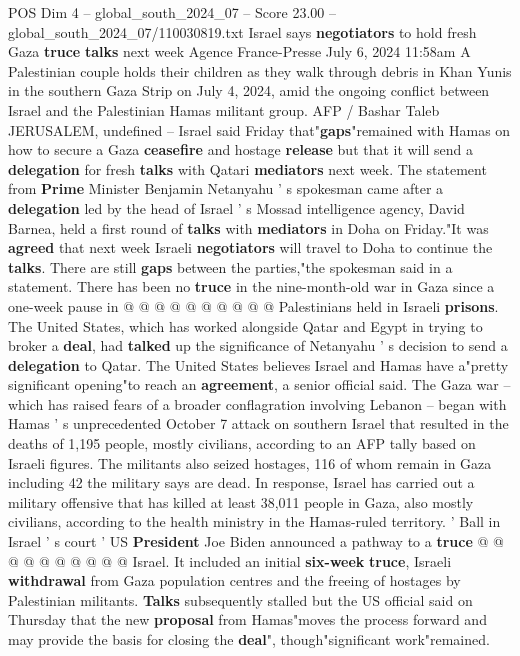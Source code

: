 \begin{textsample}{POS Dim 4 – global\_south\_2024\_07 – Score 23.00 – global\_south\_2024\_07/110030819.txt}  \label{ex:f4_pos_117}
Israel says \textbf{negotiators} to hold fresh Gaza \textbf{truce} \textbf{talks} next week Agence France-Presse July 6, 2024 11:58am A Palestinian couple holds their children as they walk through debris in Khan Yunis in the southern Gaza Strip on July 4, 2024, amid the ongoing conflict between Israel and the Palestinian Hamas militant group.
AFP / Bashar Taleb JERUSALEM, undefined -- Israel said Friday that"\textbf{gaps}"remained with Hamas on how to secure a Gaza \textbf{ceasefire} and hostage \textbf{release} but that it will send a \textbf{delegation} for fresh \textbf{talks} with Qatari \textbf{mediators} next week.
The statement from \textbf{Prime} Minister Benjamin Netanyahu ' s spokesman came after a \textbf{delegation} led by the head of Israel ' s Mossad intelligence agency, David Barnea, held a first round of \textbf{talks} with \textbf{mediators} in Doha on Friday."It was \textbf{agreed} that next week Israeli \textbf{negotiators} will travel to Doha to continue the \textbf{talks}.
There are still \textbf{gaps} between the parties,"the spokesman said in a statement.
There has been no \textbf{truce} in the nine-month-old war in Gaza since a one-week pause in @ @ @ @ @ @ @ @ @ @ Palestinians held in Israeli \textbf{prisons}.
The United States, which has worked alongside Qatar and Egypt in trying to broker a \textbf{deal}, had \textbf{talked} up the significance of Netanyahu ' s decision to send a \textbf{delegation} to Qatar.
The United States believes Israel and Hamas have a"pretty significant opening"to reach an \textbf{agreement}, a senior official said.
The Gaza war -- which has raised fears of a broader conflagration involving Lebanon -- began with Hamas ' s unprecedented October 7 attack on southern Israel that resulted in the deaths of 1,195 people, mostly civilians, according to an AFP tally based on Israeli figures.
The militants also seized hostages, 116 of whom remain in Gaza including 42 the military says are dead.
In response, Israel has carried out a military offensive that has killed at least 38,011 people in Gaza, also mostly civilians, according to the health ministry in the Hamas-ruled territory. ' Ball in Israel ' s court ' US \textbf{President} Joe Biden announced a pathway to a \textbf{truce} @ @ @ @ @ @ @ @ @ @ Israel.
It included an initial \textbf{six-week} \textbf{truce}, Israeli \textbf{withdrawal} from Gaza population centres and the freeing of hostages by Palestinian militants. \textbf{Talks} subsequently stalled but the US official said on Thursday that the new \textbf{proposal} from Hamas"moves the process forward and may provide the basis for closing the \textbf{deal}", though"significant work"remained.

\end{textsample}

